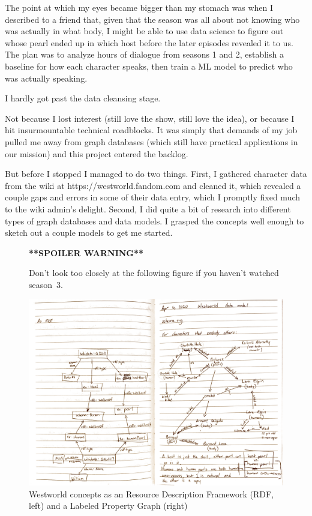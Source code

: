 \documentclass[letterpaper,11pt,onecolumn]{article}
\begin{document}
The point at which my eyes became bigger than my stomach was when I described to a friend that, 
given that the season was all about not knowing who was actually in what body, I might be able to 
use data science to figure out whose pearl ended up in which host before the later episodes 
revealed it to us. The plan was to analyze hours of dialogue from seasons 1 and 2, establish a 
baseline for how each character speaks, then train a ML model to predict who was actually speaking.

I hardly got past the data cleansing stage. 

Not because I lost interest (still love the show, still love the idea), or because I hit
insurmountable technical roadblocks. It was simply that demands of my job pulled me away from
graph databases (which still have practical applications in our mission) and this project entered
the backlog. 

But before I stopped I managed to do two things. First, I gathered character data from the wiki
at https://westworld.fandom.com and cleaned it, which revealed a couple gaps and errors in some of
their data entry, which I promptly fixed much to the wiki admin's delight. Second, I did quite
a bit of research into different types of graph databases and data models. I grasped the concepts
well enough to sketch out a couple models to get me started.

\begin{center}
\end{center}

\begin{figure}[ht]
\centering

\textbf{**SPOILER WARNING**}

Don't look too closely at the following figure if you haven't watched \mbox{season 3.}

\includegraphics[width=\columnwidth]{westworld-notebook}
\caption{Westworld concepts as an Resource Description Framework (RDF, left) and a Labeled Property
Graph (right)}
\label{fig:notebook}
\end{figure}
\end{document}
